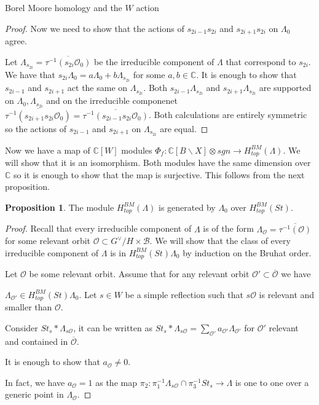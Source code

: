 \documentclass[12pt]{article}
\newcommand{\B}{\mathcal{B}}
\newcommand{\C}{\mathbb{C}}
\newcommand{\s}{\mathcal{O}}
\newcommand{\<}{\langle}
\renewcommand{\>}{\rangle}
\theoremstyle{plain}
\theoremstyle{definition}
\newtheorem{prop}[theorem]{Proposition}
\begin{document}
\begin{section}{Borel Moore homology and the $W$ action}
\begin{proof}
  Now we need to show that the actions of $s_{2i-1}s_{2i}$ and $s_{2i+1}s_{2i}$ on $\Lambda_0$ agree.

 Let $\Lambda_{s_{2i}}=\overline{\tau^{-1}(s_{2i}\s_0)}$ be the irreducible component of $\Lambda$ that correspond to $s_{2i}$. We have that $s_{2i}\Lambda_0=a\Lambda_0+b\Lambda_{s_{2i}}$ for some $a,b\in \C$. It is enough to show that $s_{2i-1}$ and $s_{2i+1}$ act the same on $\Lambda_{s_{2i}}$. Both $s_{2i-1}\Lambda_{s_{2i}}$ and $s_{2i+1}\Lambda_{s_{2i}}$ are supported on $\Lambda_0,\Lambda_{s_{2i}}$ and on the irreducible componenet $\overline{\tau^{-1}(s_{2i+1}s_{2i}\s_0)}=\overline{\tau^{-1}(s_{2i-1}s_{2i}\s_0)}$. Both calculations are entirely symmetric so the actions of $s_{2i-1}$ and $s_{2i+1}$ on $\Lambda_{s_{2i}}$ are equal.  
\end{proof}

Now we have a map of $\C[W]$ modules $\Phi_f:\C[B\backslash X]\otimes sgn\rightarrow H_{top}^{BM}(\Lambda)$. We will show that it is an isomorphism. Both modules have the same dimension over $\C$ so it is enough to show that the map is surjective. This follows from the next proposition.

\begin{prop}\label{bm cyclic}
    The module $H_{top}^{BM}(\Lambda)$ is generated by $\Lambda_0$ over $H_{top}^{BM}(St)$. 
\end{prop}

\begin{proof}
    Recall that every irreducible component of $\Lambda$ is of the form $\Lambda_\s=\overline{\tau^{-1}(\s)}$ for some relevant orbit $\s\subset G^\vee/H\times \B$.
    We will show that the class of every irreducible component of $\Lambda$ is in $H_{top}^{BM}(St)\Lambda_0$ by induction on the Bruhat order.

    Let $\s$ be some relevant orbit. Assume that for any relevant orbit $\s'\subset\overline{\s}$ we have 
    
    $\Lambda_{\s'}\in H_{top}^{BM}(St)\Lambda_0$. Let $s\in W$ be a simple reflection such that $s\s$ is relevant and smaller than $\s$. 

    Consider $St_s*\Lambda_{s\s}$, it can be written as $St_s*\Lambda_{s\s}=\sum_{\s'}a_{\s'}\Lambda_{\s'} $ for $\s'$ relevant and contained in $\overline{\s}$.

    It is enough to show that $a_\s\neq 0$. 
    
    In fact, we have $a_\s=1$ as the map $\pi_2:\pi^{-1}_1\Lambda_{s\s}\cap \pi_3^{-1}St_s\rightarrow \Lambda$ is one to one over a generic point in $\Lambda_\s$.


\end{proof}
\end{section}
\end{document}
